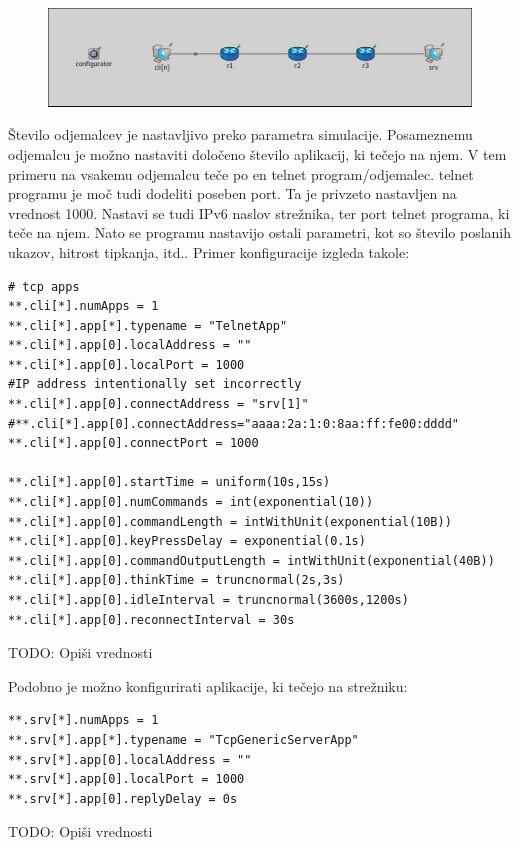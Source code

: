 \documentclass[11pt,a4paper,slovene]{myarticle}
\begin{document}
\begin{figure}[h]
  \includegraphics[width=\linewidth]{ipv6nclients.jpg}
\end{figure}

Število odjemalcev je nastavljivo preko parametra simulacije. Posameznemu odjemalcu je možno nastaviti določeno število aplikacij, ki tečejo na njem. V tem primeru na vsakemu odjemalcu teče po en telnet program/odjemalec.
telnet programu je moč tudi dodeliti poseben port. Ta je privzeto nastavljen na vrednost 1000. Nastavi se tudi IPv6 naslov strežnika, ter port telnet programa, ki teče na njem. Nato se programu nastavijo ostali parametri, kot so število poslanih ukazov, hitrost tipkanja, itd.. Primer konfiguracije izgleda takole:

\begin{lstlisting}
# tcp apps
**.cli[*].numApps = 1
**.cli[*].app[*].typename = "TelnetApp"
**.cli[*].app[0].localAddress = ""
**.cli[*].app[0].localPort = 1000
#IP address intentionally set incorrectly
**.cli[*].app[0].connectAddress = "srv[1]"
#**.cli[*].app[0].connectAddress="aaaa:2a:1:0:8aa:ff:fe00:dddd"
**.cli[*].app[0].connectPort = 1000

**.cli[*].app[0].startTime = uniform(10s,15s)
**.cli[*].app[0].numCommands = int(exponential(10))
**.cli[*].app[0].commandLength = intWithUnit(exponential(10B))
**.cli[*].app[0].keyPressDelay = exponential(0.1s)
**.cli[*].app[0].commandOutputLength = intWithUnit(exponential(40B))
**.cli[*].app[0].thinkTime = truncnormal(2s,3s)
**.cli[*].app[0].idleInterval = truncnormal(3600s,1200s)
**.cli[*].app[0].reconnectInterval = 30s
\end{lstlisting}

TODO: Opiši vrednosti

Podobno je možno konfigurirati aplikacije, ki tečejo na strežniku:
\begin{lstlisting}
**.srv[*].numApps = 1
**.srv[*].app[*].typename = "TcpGenericServerApp"
**.srv[*].app[0].localAddress = ""
**.srv[*].app[0].localPort = 1000
**.srv[*].app[0].replyDelay = 0s
\end{lstlisting}

TODO: Opiši vrednosti
\end{document}
